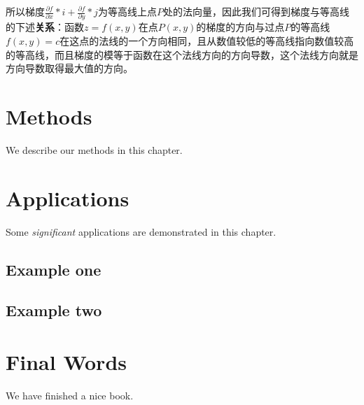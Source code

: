 \documentclass[]{book}
\begin{document}
所以梯度\(\frac{\partial f}{\partial x}*i+\frac{\partial f}{\partial y}*j\)为等高线上点\(P\)处的法向量，因此我们可得到梯度与等高线的下述\textbf{关系}：函数\(z=f(x,y)\)在点\(P(x,y)\)的梯度的方向与过点\(P\)的等高线\(f(x,y)=c\)在这点的法线的一个方向相同，且从数值较低的等高线指向数值较高的等高线，而且梯度的模等于函数在这个法线方向的方向导数，这个法线方向就是方向导数取得最大值的方向。

\hypertarget{methods}{%
\chapter{Methods}\label{methods}}

We describe our methods in this chapter.

\hypertarget{applications}{%
\chapter{Applications}\label{applications}}

Some \emph{significant} applications are demonstrated in this chapter.

\hypertarget{example-one}{%
\section{Example one}\label{example-one}}

\hypertarget{example-two}{%
\section{Example two}\label{example-two}}

\hypertarget{final-words}{%
\chapter{Final Words}\label{final-words}}

We have finished a nice book.


\end{document}
